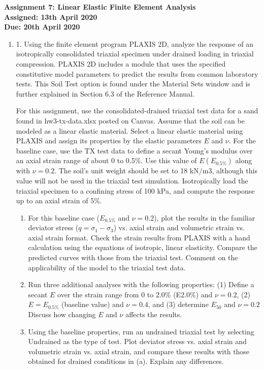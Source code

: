 \documentclass[a4paper,12pt]{article}
\begin{document}
\begin{centering}
	\textbf{
		Assignment 7: Linear Elastic Finite Element Analysis\\
		Assigned: 13th April 2020\\
		Due: 20th April 2020\\
	}
\end{centering}

\vspace{1em}
 
\begin{enumerate}

	\item     1. Using the finite element program PLAXIS 2D, analyze the response of an isotropically consolidated triaxial specimen under drained loading in triaxial compression.  PLAXIS 2D includes a module that uses the specified constitutive model parameters to predict the results from common laboratory tests.  This Soil Test option is found under the Material Sets window and is further explained in Section 6.3 of the Reference Manual.  
	
	For this assignment, use the consolidated-drained triaxial test data for a sand found in hw3-tx-data.xlsx posted on Canvas.  Assume that the soil can be modeled as a linear elastic material.  Select a linear elastic material using PLAXIS and assign its properties by the elastic parameters $E$ and $\nu$.  For the baseline case, use the TX test data to define a secant Young's modulus over an axial strain range of about 0 to 0.5\%.  Use this value of $E (E_{0.5\%})$ along with $\nu = 0.2$.  The soil's unit weight should be set to 18 kN/m3, although this value will not be used in the triaxial test simulation.  Isotropically load the triaxial specimen to a confining stress of 100 kPa, and compute the response up to an axial strain of 5\%.  
	
	\begin{enumerate}
		\item For this baseline case ($E_{0.5\%}$ and $\nu = 0.2$), plot the results in the familiar deviator stress ($q = \sigma_1 - \sigma_3$) vs. axial strain and volumetric strain vs. axial strain format.  Check the strain results from PLAXIS with a hand calculation using the equations of isotropic, linear elasticity.  Compare the predicted curves with those from the triaxial test.  Comment on the applicability of the model to the triaxial test data.
		\item Run three additional analyses with the following properties: (1) Define a secant $E$ over the strain range from 0 to 2.0\% (E2.0\%) and $\nu = 0.2$, (2) $E = E_{0.5\%}$ (baseline value) and $\nu = 0.4$, and (3) determine $E_{50}$ and $\nu = 0.2$  Discuss how changing $E$ and $\nu$ affects the results.
		\item Using the baseline properties, run an undrained triaxial test by selecting Undrained as the type of test.  Plot deviator stress vs. axial strain and volumetric strain vs. axial strain, and compare these results with those obtained for drained conditions in (a).  Explain any differences.
	\end{enumerate}
	

\end{enumerate}
\end{document}
